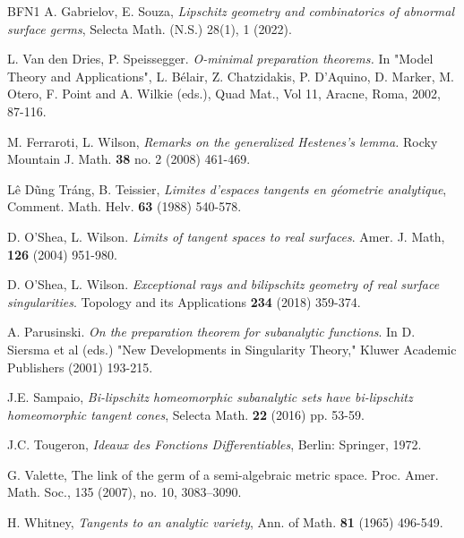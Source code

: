 \documentclass[article]{amsart}
\newcommand{\0}{{\bf 0}}
\begin{document}
\begin{thebibliography}{BFN1}
A. Gabrielov, E. Souza,  {\it Lipschitz geometry and combinatorics of abnormal surface germs}, Selecta
Math. (N.S.) 28(1), 1 (2022).

 L. Van den Dries, P. Speissegger. {\it O-minimal preparation theorems.} In "Model Theory and Applications", L. Bélair, Z. Chatzidakis, P. D'Aquino, D. Marker, M. Otero, F. Point and A. Wilkie (eds.), Quad Mat., Vol 11, Aracne, Roma, 2002, 87-116.  

 M. Ferraroti, L. Wilson, {\it Remarks on the generalized Hestenes's lemma.}  Rocky Mountain J. Math. {\bf 38} no. 2 (2008) 461-469.





 L\^e D\~ung Tr\'ang, B. Teissier, {\it Limites 
d'espaces tangents en 
g\'eometrie analytique}, Comment. Math. Helv.  {\bf 63} (1988) 
540-578.


 D. O'Shea,  L. Wilson.  {\it Limits of tangent spaces to real surfaces}.  Amer. J. Math, {\bf 126} (2004) 951-980. 

 D. O'Shea,  L. Wilson. {\it Exceptional rays and bilipschitz geometry of real surface singularities}. Topology and its Applications {\bf 234} (2018) 359-374.

 A. Parusinski. {\it On the preparation theorem for subanalytic functions}.  In D. Siersma et al (eds.) "New Developments in Singularity Theory," Kluwer Academic Publishers (2001) 193-215.

 J.E. Sampaio, {\it Bi-lipschitz homeomorphic subanalytic sets have bi-lipschitz homeomorphic tangent cones}, Selecta Math. {\bf 22} (2016) pp. 53-59. 

 J.C. Tougeron, {\it Ideaux des Fonctions Differentiables}, Berlin: Springer, 1972.

 G. Valette,  The link of the germ of a semi-algebraic metric space. Proc. Amer. Math. Soc., 135
(2007), no. 10, 3083–3090.

 H. Whitney, {\it Tangents to an analytic variety}, Ann. of Math. {\bf 81} (1965) 496-549.


\end{thebibliography}
\end{document}
